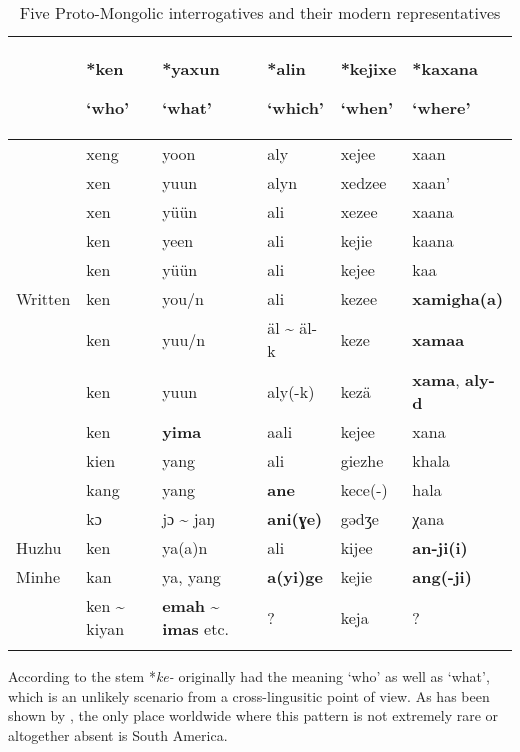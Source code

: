\begin{table}
\caption{Five Proto-Mongolic interrogatives and their modern representatives}
\label{tab:mong:16}
\small
\begin{tabularx}{\textwidth}{lQQQQQ}
\lsptoprule
& \textbf{*ken}

\textbf{‘who’} & \textbf{*yaxun}

\textbf{‘what’} & \textbf{*alin}

\textbf{‘which’} & \textbf{*kejixe}

\textbf{‘when’} & \textbf{*kaxana}

\textbf{‘where’}\\
\midrule
{} & xeng & yoon & aly & xejee & xaan\\
 & xen & yuun & alyn & xedzee & xaan’\\
 & xen & yüün & ali & xezee & xaana\\
 & ken & yeen & ali & kejie & kaana\\
 & ken & yüün & ali & kejee & kaa\\
Written  & ken & you/n & ali & kezee & \textbf{xamigha(}\textbf{a)}\\
 & ken & yuu/n & äl {\textasciitilde} äl-k & keze & \textbf{xamaa}\\
 & ken & yuun & aly(-k) & kezä & \textbf{xama}, \textbf{aly-}\textbf{d}\\
 & ken & \textbf{yima} & aali & kejee & xana\\
 & kien & yang & ali & giezhe & khala\\
 & kang & yang & \textbf{ane} & kece(-) & hala\\
 & kɔ & jɔ {\textasciitilde} jaŋ & \textbf{ani(ɣe)} & gədʒe & χana\\
Huzhu  & ken & ya(a)n & ali & kijee & \textbf{an-ji(i)}\\
Minhe  & kan & ya, yang & \textbf{a(yi)ge} & kejie & \textbf{ang(-ji)}\\
 & ken {\textasciitilde} kiyan & \textbf{emah} {\textasciitilde} \textbf{imas} etc. & ? & keja & ?\\
\lspbottomrule
\end{tabularx}
\end{table}

According to \citet[20]{Janhunen2003a} the stem *\textit{ke-} originally had the meaning ‘who’ as well as ‘what’, which is an unlikely scenario from a cross-lingusitic point of view. As has been shown by \citet{Cysouw2005}, the only place worldwide where this pattern is not extremely rare or altogether absent is South America.

